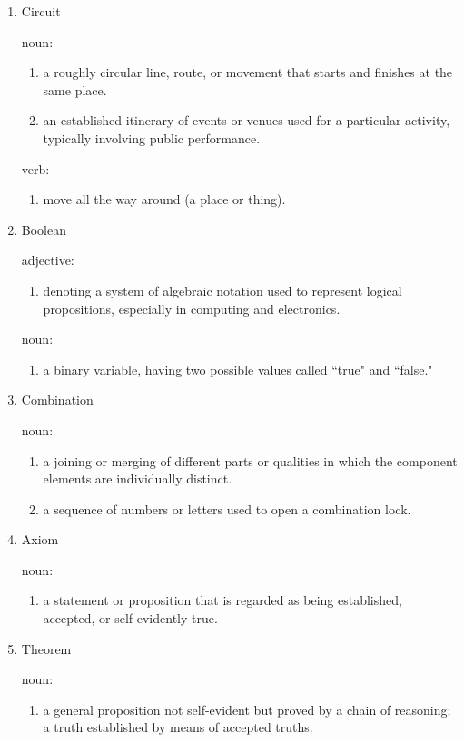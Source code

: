 \documentclass[12pt]{article}
\begin{document}
\begin{enumerate}
  \item Circuit

  noun:

  \begin{enumerate}
    \item a roughly circular line, route, or movement that starts and finishes at the same place.
    \item an established itinerary of events or venues used for a particular activity, typically involving public performance.
  \end{enumerate}

  verb:

  \begin{enumerate}
    \item move all the way around (a place or thing).
  \end{enumerate}

  \item Boolean

  adjective:

  \begin{enumerate}
    \item denoting a system of algebraic notation used to represent logical propositions, especially in computing and electronics.
  \end{enumerate}

  noun:

  \begin{enumerate}
    \item a binary variable, having two possible values called ``true" and ``false."
  \end{enumerate}

  \item{Combination}

  noun:

  \begin{enumerate}
    \item a joining or merging of different parts or qualities in which the component elements are individually distinct.
    \item a sequence of numbers or letters used to open a combination lock.
  \end{enumerate}

  \item{Axiom}

  noun:

  \begin{enumerate}
    \item a statement or proposition that is regarded as being established, accepted, or self-evidently true.
  \end{enumerate}

  \item{Theorem}

  noun:

  \begin{enumerate}
    \item a general proposition not self-evident but proved by a chain of reasoning; a truth established by means of accepted truths.
  \end{enumerate}
\end{enumerate}
\end{document}

